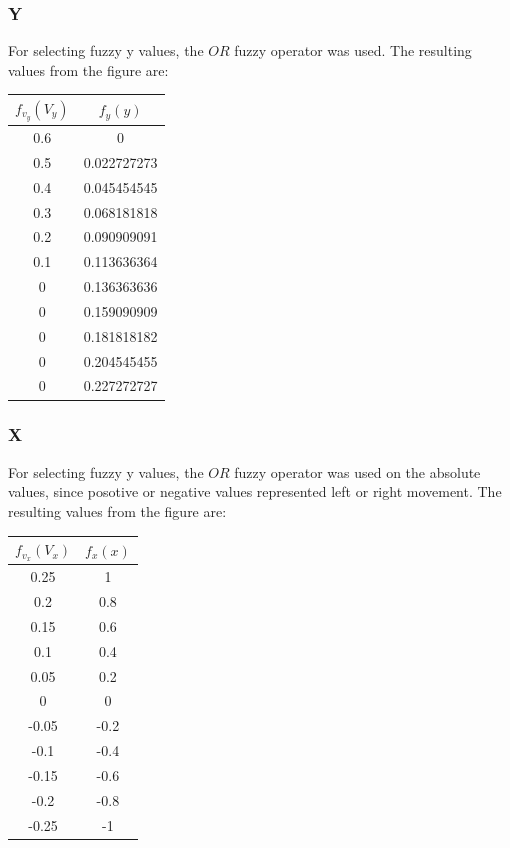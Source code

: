 \documentclass[12pt]{article}
\begin{document}
\subsubsection{Y}
For selecting fuzzy y values, the $OR$ fuzzy operator was used.  The resulting values from the figure are: \\

\begin{tabular}{|c|c|}
	\hline
	$f_{v_y}(V_y)$	&	$f_{y}(y)$		\\
	\hline
	0.6			&	0			\\
	0.5			&	0.022727273	\\
	0.4			&	0.045454545	\\
	0.3			&	0.068181818	\\
	0.2			&	0.090909091	\\
	0.1			&	0.113636364	\\
	0			&	0.136363636	\\
	0			&	0.159090909	\\
	0			&	0.181818182	\\
	0			&	0.204545455	\\
	0			&	0.227272727	\\
	\hline
\end{tabular}

\subsubsection{X}
For selecting fuzzy y values, the $OR$ fuzzy operator was used on the absolute values, since posotive or 
negative values represented left or right movement. The resulting values from the figure are: \\

\begin{tabular}{|c|c|}
	\hline
	$f_{v_x}(V_x)$	&	$f_{x}(x)$		\\
	\hline
	0.25		&	1		\\
	0.2		&	0.8		\\
	0.15		&	0.6		\\
	0.1		&	0.4		\\
	0.05		&	0.2		\\
	0		&	0		\\
	-0.05	&	-0.2		\\
	-0.1		&	-0.4		\\
	-0.15	&	-0.6		\\
	-0.2		&	-0.8		\\
	-0.25	&	-1		\\
	\hline
\end{tabular}
\end{document}
